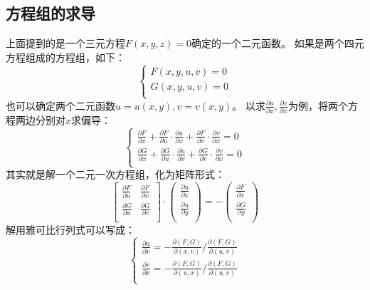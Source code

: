 \subsection{方程组的求导}

上面提到的是一个三元方程$F\left( x,y,z \right) =0$确定的一个二元函数。
如果是两个四元方程组成的方程组，如下：
\[
\left\{ \begin{array}{c}
	F\left( x,y,u,v \right) =0\\
	G\left( x,y,u,v \right) =0\\
\end{array} \right.
\]
也可以确定两个二元函数$u=u\left( x,y \right) ,v=v\left( x,y \right) $。
以求$\frac{\partial u}{\partial x},\frac{\partial v}{\partial x}$为例，将两个方程两边分别对$x$求偏导：
\[
\begin{cases}
	\frac{\partial F}{\partial x}+\frac{\partial F}{\partial u}\cdot \frac{\partial u}{\partial x}+\frac{\partial F}{\partial v}\cdot \frac{\partial v}{\partial x}=0\\
	\frac{\partial G}{\partial x}+\frac{\partial G}{\partial u}\cdot \frac{\partial u}{\partial x}+\frac{\partial G}{\partial v}\cdot \frac{\partial v}{\partial x}=0\\
\end{cases}
\]
其实就是解一个二元一次方程组，化为矩阵形式：
\[
\left[ \begin{matrix}
	\frac{\partial F}{\partial u}&		\frac{\partial F}{\partial v}\\
	\frac{\partial G}{\partial u}&		\frac{\partial G}{\partial v}\\
\end{matrix} \right] \cdot \left( \begin{array}{c}
	\frac{\partial u}{\partial x}\\
	\frac{\partial u}{\partial y}\\
\end{array} \right) =-\left( \begin{array}{c}
	\frac{\partial F}{\partial x}\\
	\frac{\partial G}{\partial y}\\
\end{array} \right)
\]
解用雅可比行列式可以写成：
\[
\begin{cases}
	\frac{\partial u}{\partial x}=-\frac{\partial \left( F,G \right)}{\partial \left( x,v \right)}/\frac{\partial \left( F,G \right)}{\partial \left( u,v \right)}\\
	\frac{\partial v}{\partial x}=-\frac{\partial \left( F,G \right)}{\partial \left( u,x \right)}/\frac{\partial \left( F,G \right)}{\partial \left( u,v \right)}\\
\end{cases}
\]

